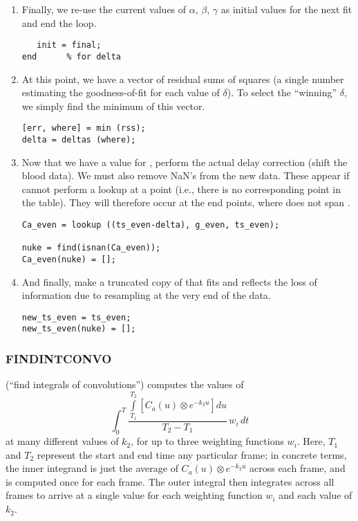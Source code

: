 \begin{enumerate}
\item Finally, we re-use the current values of $\alpha$, $\beta$,
  $\gamma$ as initial values for the next fit and end the  loop.
\begin{verbatim}
   init = final;
end      % for delta
\end{verbatim}

\item At this point, we have a vector of residual sums of squares (a single
  number estimating the goodness-of-fit for each value of $\delta$).
  To select the ``winning'' $\delta$, we simply find the minimum of
  this vector.
\begin{verbatim}
[err, where] = min (rss);
delta = deltas (where);
\end{verbatim}

\item Now that we have a value for , perform the actual
delay correction (shift the blood data).  We must also remove NaN's
from the new data.  These appear if  cannot perform a
lookup at a point (i.e., there is no corresponding point in the table).
They will therefore occur at the end points, where 
does not span .
\begin{verbatim}
Ca_even = lookup ((ts_even-delta), g_even, ts_even);

nuke = find(isnan(Ca_even));
Ca_even(nuke) = [];
\end{verbatim}

\item And finally, make  a truncated copy of
   that fits  and reflects the loss of
  information due to resampling at the very end of the data.
\begin{verbatim}
new_ts_even = ts_even;
new_ts_even(nuke) = [];
\end{verbatim}
\end{enumerate}


\subsubsection{FINDINTCONVO}
\label{sec:findintconvo_listing}

 (``find integrals of convolutions'') computes the
values of
\begin{equation}
\label{eq:conv_int}
  \int_{0}^{T} \frac{\int\limits_{T_1}^{T_2}
    \left[ C_{a}(u) \otimes e^{-k_{2}u} \right] du}{T_2 - T_1} \, w_i \, dt
\end{equation}
at many different values of $k_2$, for up to three weighting functions
$w_i$.  Here, $T_1$ and $T_2$ represent the start and end time any
particular frame; in concrete terms, the inner integrand is just the
average of $C_{a}(u) \otimes e^{-k_{2}u}$ across each frame, and is
computed once for each frame.  The outer integral then integrates across
all frames to arrive at a single value for each weighting function
$w_i$ and each value of $k_2$.

